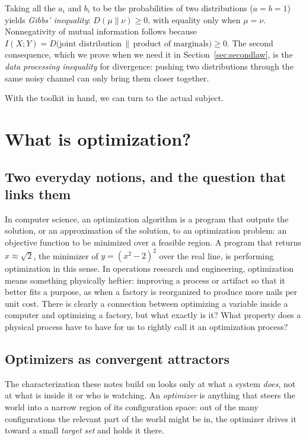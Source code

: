\documentclass[10pt]{article}
\theoremstyle{definition}
\theoremstyle{remark}
\begin{document}
Taking all the $a_i$ and $b_i$ to be the probabilities of two distributions ($a = b = 1$) yields \emph{Gibbs' inequality}: $D(\mu \| \nu) \ge 0$, with equality only when $\mu = \nu$. Nonnegativity of mutual information follows because $I(X;Y) = D\big(\text{joint distribution} \,\|\, \text{product of marginals}\big) \ge 0$. The second consequence, which we prove when we need it in Section~\ref{sec:secondlaw}, is the \emph{data processing inequality} for divergence: pushing two distributions through the same noisy channel can only bring them closer together.

With the toolkit in hand, we can turn to the actual subject.

\section{What is optimization?}
\label{sec:optsys}

\subsection{Two everyday notions, and the question that links them}

In computer science, an optimization algorithm is a program that outputs the solution, or an approximation of the solution, to an optimization problem: an objective function to be minimized over a feasible region. A program that returns $x \approx \sqrt 2$, the minimizer of $y = (x^2 - 2)^2$ over the real line, is performing optimization in this sense. In operations research and engineering, optimization means something physically heftier: improving a process or artifact so that it better fits a purpose, as when a factory is reorganized to produce more nails per unit cost. There is clearly a connection between optimizing a variable inside a computer and optimizing a factory, but what exactly is it? What property does a physical process have to have for us to rightly call it an optimization process?

\subsection{Optimizers as convergent attractors}
\label{sec:attractor}

The characterization these notes build on looks only at what a system \emph{does}, not at what is inside it or who is watching. An \emph{optimizer} is anything that steers the world into a narrow region of its configuration space: out of the many configurations the relevant part of the world might be in, the optimizer drives it toward a small \emph{target set} and holds it there.
\end{document}
